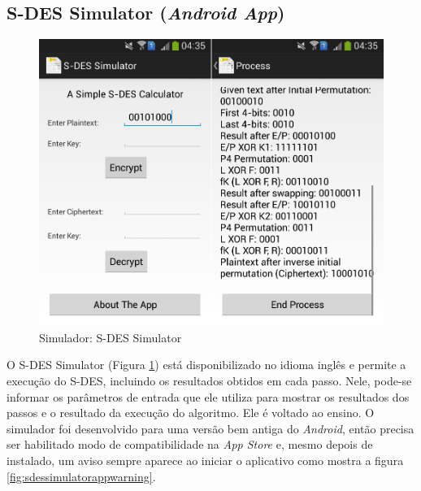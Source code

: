 
\subsection{S-DES Simulator (\textit{Android App})}

\begin{figure}[H]
    \centering
    \caption{Simulador: S-DES Simulator}
    \label{fig:sdessimulatorapp}
    \includegraphics[width=.75\linewidth]{Simuladores/SDESSimulatorApp.png}
\end{figure}

O S-DES Simulator (Figura \ref{fig:sdessimulatorapp}) está disponibilizado no idioma inglês e permite a execução do S-DES, incluindo os resultados obtidos em cada passo. Nele, pode-se informar os parâmetros de entrada que ele utiliza para mostrar os resultados dos passos e o resultado da execução do algoritmo. Ele é voltado ao ensino. O simulador foi desenvolvido para uma versão bem antiga do \textit{Android}, então precisa ser habilitado modo de compatibilidade na \textit{App Store} e, mesmo depois de instalado, um aviso sempre aparece ao iniciar o aplicativo como mostra a figura \ref{fig:sdessimulatorappwarning}. \cite{mountogiannakis15}

